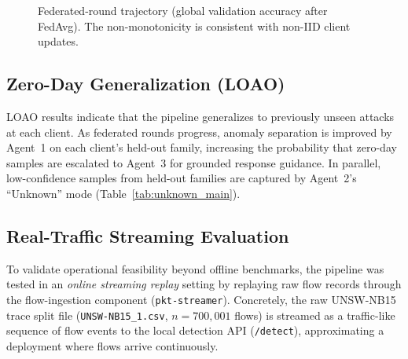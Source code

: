 \documentclass[conference]{IEEEtran}
\begin{document}
\begin{figure}[t]
\centering
{}
\caption{Federated-round trajectory (global validation accuracy after FedAvg). The non-monotonicity is consistent with non-IID client updates.}
\label{fig:fl_curve}
\end{figure}

\subsection{Zero-Day Generalization (LOAO)}
\label{sec:zeroday-narrative}

LOAO results indicate that the pipeline generalizes to previously unseen attacks at each client. As federated rounds progress, anomaly separation is improved by Agent~1 on each client’s held-out family, increasing the probability that zero-day samples are escalated to Agent~3 for grounded response guidance. In parallel, low-confidence samples from held-out families are captured by Agent~2’s ``Unknown'' mode (Table~\ref{tab:unknown_main}).

\subsection{Real-Traffic Streaming Evaluation}
\label{sec:real_traffic}

To validate operational feasibility beyond offline benchmarks, the pipeline was tested in an \emph{online streaming replay} setting by replaying raw flow records through the flow-ingestion component (\texttt{pkt-streamer}). Concretely, the raw UNSW-NB15 trace split file (\texttt{UNSW-NB15\_1.csv}, $n=700{,}001$ flows) is streamed as a traffic-like sequence of flow events to the local detection API (\texttt{/detect}), approximating a deployment where flows arrive continuously.
\end{document}
